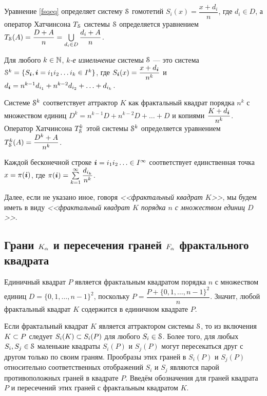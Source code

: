 Уравнение \eqref{fsqeq} определяет систему ${\EuScript S}$ гомотетий $S_i(x)=\dfrac{x+d_i}{n}$, где $d_i\in D$, а оператор Хатчинсона $T_{\EuScript S}$ системы ${\EuScript S}$ определяется уравнением $T_{\EuScript S}(A)=\dfrac{D+A}{n}=\bigcup\limits_{d_i\in D}\dfrac{d_i+A}{n}$.

\begin{definition}\label{refin}
 Для любого $k\in \mathbb{N}$, {\em $k$-е измельчение} системы ${\EuScript S}$ --- это система ${\EuScript S}^k=\{S_{\bm{i}}, {\bm{i}}=i_1i_2\ldots i_k\in I^k\}$, где $S_{\bm{i}}(x)=\dfrac{x+d_{\bm{i}}}{n^k}$ и $d_{\bm{i}}=n^{k-1}d_{i_1}+n^{k-2}d_{i_2}+\ldots+d_{i_k}$. 
\end{definition}

Системе ${\EuScript S}^k$ соответствует аттрактор $K$ как фрактальный квадрат порядка $n^k$ с множеством единиц $D^k=n^{k-1}D+n^{k-2}D+\ldots+D$ и копиями $\dfrac{K+d_{\bm{i}}}{n^k}$.
Оператор Хатчинсона $T_{\EuScript S}^k$ этой системы ${\EuScript S}^k$ определяется уравнением $T_{\EuScript S}^k(A)=\dfrac{D^k+A}{n^k}$.

Каждой бесконечной строке ${\bm{i}}=i_1i_2\ldots\in I^\infty$ соответствует единственная точка $x=\pi({\bm{i}})$, где $\pi({\bm{i}})=\sum\limits_{k=1}^\infty \dfrac{d_{i_k}}{n^k}$.

\begin{remark}%
Далее, если не указано иное, говоря {\em <<фрактальный квадрат $K$>>}, мы будем иметь в виду {\em <<фрактальный квадрат $K$ порядка $n$ с множеством единиц $D$>>}. 
\end{remark}


\subsection{Грани $K_\alpha$ и пересечения граней $F_\alpha$ фрактального квадрата}

Единичный квадрат $P$ является фрактальным квадратом порядка $n$ с множеством единиц $D=\{0,1,\ldots,n-1\}^2$, поскольку $P=\dfrac{P+\{0,1,\ldots,n-1\}^2}{n}.$
Значит, любой фрактальный квадрат $K$ содержится в единичном квадрате $P$.

Если фрактальный квадрат $K$ является аттрактором системы ${\EuScript S}$, то из включения $K\subset P$ следует $S_i(K)\subset S_i(P)$ для любого $S_i\in{\EuScript S}$.
Более того, для любых $S_i, S_j\in{\EuScript S}$ маленькие квадраты $S_i(P)$ и $S_j(P)$ могут пересекаться друг с другом только по своим граням.
Прообразы этих граней в $S_i(P)$ и $S_j(P)$ относительно соответственных отображений $S_i$ и $S_j$ являются парой противоположных граней в квадрате $P$.
Введём обозначения для граней квадрата $P$ и пересечений этих граней с фрактальным квадратом $K$.

